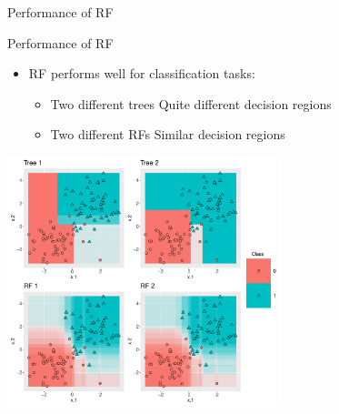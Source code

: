 \documentclass[11pt,compress,t,notes=noshow, xcolor=table]{beamer}
\begin{document}
\begin{vbframe}{Performance of RF}
\end{vbframe}

\begin{vbframe}{Performance of RF}

    \begin{itemize}
        \item \small RF performs well for classification tasks:
        \begin{itemize}
            \item \small Two different trees \textrightarrow Quite different decision regions
            \item \small Two different RFs \textrightarrow Similar decision regions
        \end{itemize}
    \end{itemize}
\begin{center}
 \includegraphics[width = 0.6\textwidth]{figure/nutshell_classif_combined_1.pdf}
\end{center}




\end{vbframe}
\end{document}
